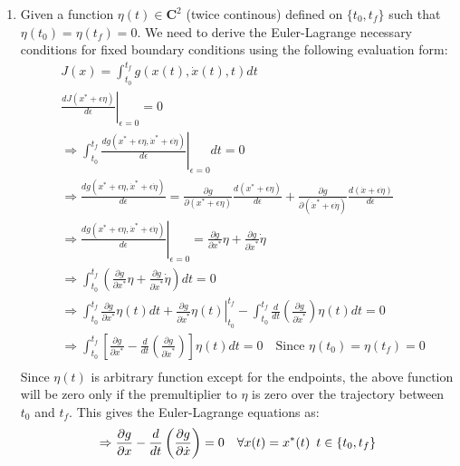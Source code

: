 \begin{enumerate}
\begin{enumerate}
  \end{enumerate}
  \newpage
  \item Given a function $\eta(t) \in \mathbf{C}^2$ (twice continous) defined on $\{t_0, t_f\}$ such that $\eta(t_0) = \eta(t_f) = 0$. We need to derive the Euler-Lagrange necessary conditions for fixed boundary conditions using the following evaluation form:
  \begin{align*}
   &J(x) = \int_{t_0}^{t_f} g(x(t), \dot x(t), t) dt \\
   &\left.\frac{d J(x^* + \epsilon \eta) }{d \epsilon} \right|_{\epsilon = 0} = 0 \\[5pt]
   &\Rightarrow \int_{t_0}^{t_f} \left.\frac{d g(x^* + \epsilon \eta, {\dot x}^* + \epsilon \dot \eta)}{d \epsilon}\right|_{\epsilon = 0} dt = 0\\
   &\Rightarrow \frac{dg(x^* + \epsilon \eta,{\dot x}^* + \epsilon \dot \eta)}{d \epsilon} = \frac{\partial g}{\partial (x^* + \epsilon \eta)} \frac{d(x^* + \epsilon \eta)}{d\epsilon} + \frac{\partial g}{\partial (\dot x^* + \epsilon \dot \eta)} \frac{d(\dot x + \epsilon \dot \eta)}{d\epsilon}\\
   &\Rightarrow  \left. \frac{dg(x^* + \epsilon \eta,{\dot x}^* + \epsilon \dot \eta)}{d \epsilon}\right|_{\epsilon = 0} = \frac{\partial g}{\partial x^* } \eta + \frac{\partial g}{\partial \dot x^*} \dot \eta\\
   &\Rightarrow \int_{t_0}^{t_f} \left( \frac{\partial g}{\partial x^*} \eta  + \frac{\partial g}{\partial \dot x^*} \dot \eta \right) dt = 0\\
   &\Rightarrow \int_{t_0}^{t_f} \frac{\partial g}{\partial x^*} \eta(t) dt +\left. \frac{\partial g}{\partial \dot x^*} \eta(t)\right|_{t_0}^{t_f} - \int_{t_0}^{t_f} \frac{d}{dt} \left( \frac{\partial g}{\partial \dot x^*} \right) \eta (t) dt = 0 \\
   &\Rightarrow \int_{t_0}^{t_f} \left[ \frac{\partial g}{\partial x^*} - \frac{d}{dt} \left( \frac{\partial g}{\partial \dot x^*} \right)\right] \eta (t) dt = 0 \quad \text{Since } \eta(t_0) = \eta (t_f) = 0\\
  \end{align*}
  Since $\eta(t)$ is arbitrary function except for the endpoints, the above function will be zero only if the premultiplier to $\eta$ is zero over the trajectory between $t_0 $ and $t_f$. This gives the Euler-Lagrange equations as:
  \begin{equation*}
  \Rightarrow  \frac{\partial g}{\partial x} - \frac{d}{dt} \left( \frac{\partial g}{\partial \dot x} \right) = 0 \quad \forall x(t) = x^*(t) \enskip t \in \{t_0,t_f\} 

\end{equation*}
\end{enumerate}
